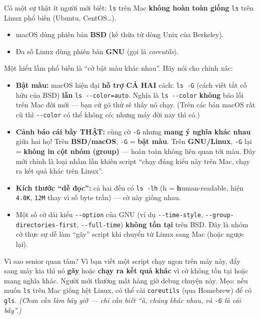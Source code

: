 \documentclass[12pt,a4paper]{article}
\begin{document}
\begin{seniorbox}[title={Góc Senior \#1 --- BSD \texttt{ls} (macOS) vs GNU \texttt{ls} (Linux)}]
Có một sự thật ít người mới biết: \texttt{ls} trên Mac \textbf{không hoàn toàn giống} \texttt{ls} trên Linux phổ biến (Ubuntu, CentOS\ldots).

\begin{itemize}[leftmargin=*]
  \item macOS dùng phiên bản \textbf{BSD} (kế thừa từ dòng Unix của Berkeley).
  \item Đa số Linux dùng phiên bản \textbf{GNU} (gọi là \textit{coreutils}).
\end{itemize}

Một hiểu lầm phổ biến là ``cờ bật màu khác nhau''. Hãy nói cho chính xác:

\begin{itemize}[leftmargin=*]
  \item \textbf{Bật màu:} macOS hiện đại \textbf{hỗ trợ CẢ HAI} cách: \texttt{ls -G} (cách viết tắt cố hữu của BSD) \textbf{lẫn} \texttt{ls -{}-color=auto}. Nghĩa là \texttt{ls -{}-color} \textbf{không} báo lỗi trên Mac đời mới --- bạn cứ gõ thử sẽ thấy nó chạy. (Trên các bản macOS rất cũ thì \texttt{-{}-color} có thể không có; nhưng máy đời nay thì có.)
  \item \textbf{Cảnh báo cái bẫy THẬT:} cùng cờ \texttt{-G} nhưng \textbf{mang ý nghĩa khác nhau} giữa hai họ! Trên \textbf{BSD/macOS}, \texttt{-G} = \textbf{bật màu}. Trên \textbf{GNU/Linux}, \texttt{-G} lại = \textbf{không in cột nhóm (group)} --- hoàn toàn không liên quan tới màu. Đây mới chính là loại nhầm lẫn khiến script ``chạy đúng kiểu này trên Mac, chạy ra kết quả khác trên Linux''.
  \item \textbf{Kích thước ``dễ đọc'':} cả hai đều có \texttt{ls -lh} (h = \textbf{h}uman-readable, hiện \texttt{4.0K}, \texttt{12M} thay vì số byte trần) --- cờ này giống nhau.
  \item Một số cờ dài kiểu \texttt{-{}-option} của GNU (ví dụ \texttt{-{}-time-style}, \texttt{-{}-group-directories-first}, \texttt{-{}-full-time}) \textbf{không tồn tại} trên BSD. Đây là nhóm cờ thực sự dễ làm ``gãy'' script khi chuyển từ Linux sang Mac (hoặc ngược lại).
\end{itemize}

Vì sao senior quan tâm? Vì bạn viết một script chạy ngon trên máy này, đẩy sang máy kia thì nó \textbf{gãy} hoặc \textbf{chạy ra kết quả khác} vì cờ không tồn tại hoặc mang nghĩa khác. Người mới thường mất hàng giờ debug chuyện này. Mẹo: nếu muốn \texttt{ls} trên Mac giống hệt Linux, có thể cài \texttt{coreutils} (qua Homebrew) để có \texttt{gls}. \textit{(Chưa cần làm bây giờ --- chỉ cần biết ``à, chúng khác nhau, và \texttt{-G} là cái bẫy''.)}
\end{seniorbox}
\end{document}
